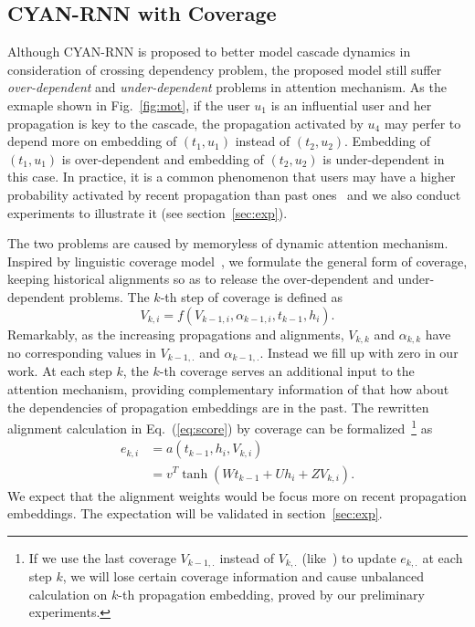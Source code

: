 \subsection{CYAN-RNN with Coverage}
\label{sec:coverage}

Although CYAN-RNN is proposed to better model cascade dynamics in consideration
of crossing dependency problem, the proposed model still suffer
\emph{over-dependent} and \emph{under-dependent} problems in
attention mechanism.
As the exmaple shown in Fig.~\ref{fig:mot}, if the user $u_1$ is an influential
user and her propagation is key to the cascade, the propagation activated by
$u_4$ may perfer to depend more on embedding of $(t_1, u_1)$ instead of $(t_2, u_2)$.
Embedding of $(t_1, u_1)$ is over-dependent and embedding of $(t_2, u_2)$
is under-dependent in this case. In practice, it is a common phenomenon that
users may have a higher probability activated by recent propagation than past ones~\cite{} and we
also conduct experiments to illustrate it (see section~\ref{sec:exp}).

The two problems are caused by memoryless of dynamic attention mechanism.
Inspired by linguistic coverage model~\cite{tu2016modeling}, we formulate the
general form of coverage, keeping historical alignments so
as to release the over-dependent and under-dependent problems. The $k$-th step
of coverage is defined as
\begin{equation}
\label{eq:cov}
V_{k,i}=f\left(V_{k-1, i}, \alpha_{k-1,i}, t_{k-1}, h_i\right).
\end{equation}
Remarkably, as the increasing propagations and alignments, $V_{k,k}$ and
$\alpha_{k,k}$ have no corresponding values in $V_{k-1,.}$ and
$\alpha_{k-1,.}$. Instead we fill up with zero in our work. 
At each step $k$, the $k$-th coverage serves an additional input to the
attention mechanism, providing complementary information of that how about the
dependencies of propagation embeddings are in the past. The rewritten
alignment calculation in Eq.~(\ref{eq:score}) by coverage can be
formalized~\footnote{
If we use the last coverage $V_{k-1,.}$ instead of
$V_{k,.}$ (like~\cite{tu2016modeling}) to update $e_{k,.}$ at each step $k$, 
we will lose certain coverage information and cause unbalanced
calculation on $k$-th propagation embedding, proved by our preliminary
experiments.} as
\begin{equation}
\label{eq:att_cov}
\begin{aligned}
e_{k,i} &= a(t_{k-1}, h_i, V_{k,i}) \\
& = v^T\tanh(W t_{k-1}+U h_i+Z V_{k,i}).
\end{aligned}
\end{equation}
We expect that the alignment weights would be focus more on recent propagation
embeddings. The expectation will be validated in section~\ref{sec:exp}.   


